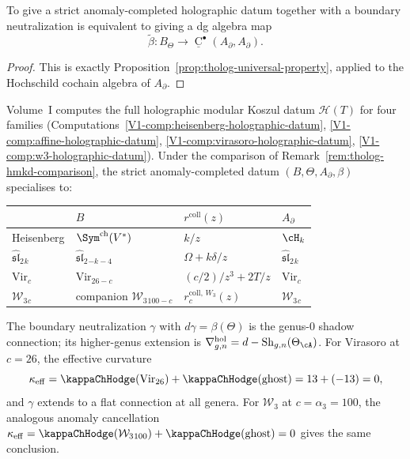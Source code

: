\begin{proposition}
To give a strict anomaly-completed holographic datum together with a boundary neutralization is equivalent to giving a dg algebra map
\[
\widetilde\beta:B_{\Theta}\longrightarrow \underline{\operatorname{C}}^{\bullet}(A_{\partial},A_{\partial}).
\]
\end{proposition}

\begin{proof}
This is exactly Proposition~\ref{prop:tholog-universal-property}, applied to the Hochschild cochain algebra of \(A_{\partial}\).
\end{proof}

\begin{remark}
Volume~I computes the full holographic modular Koszul datum
$\mathcal{H}(T)$ for four families
(Computations~\ref*{V1-comp:heisenberg-holographic-datum},
\ref*{V1-comp:affine-holographic-datum},
\ref*{V1-comp:virasoro-holographic-datum},
\ref*{V1-comp:w3-holographic-datum}).
Under the comparison of
Remark~\ref{rem:tholog-hmkd-comparison}, the strict
anomaly-completed datum $(B,\Theta,A_\partial,\beta)$
specialises to:
\begin{center}
\renewcommand{\arraystretch}{1.15}
\begin{tabular}{llll}
& $B$ & $r^{\mathrm{coll}}(z)$ & $A_\partial$ \\
\hline
Heisenberg & $\Sym^{\mathrm{ch}}(V^*)$ & $k/z$ & $\cH_k$ \\
$\widehat{\mathfrak{sl}}_2{}_k$
 & $\widehat{\mathfrak{sl}}_2{}_{-k-4}$
 & $\Omega + k\delta/z$
 & $\widehat{\mathfrak{sl}}_2{}_k$ \\
$\mathrm{Vir}_c$
 & $\mathrm{Vir}_{26-c}$
 & $(c/2)/z^3+2T/z$
 & $\mathrm{Vir}_c$ \\
$\mathcal W_3{}_c$
 & companion $\mathcal W_3{}_{100-c}$
 & $r_c^{\mathrm{coll},\,W_3}(z)$
 & $\mathcal W_3{}_c$
\end{tabular}
\end{center}
The boundary neutralization $\gamma$ with
$d\gamma=\beta(\Theta)$ is the genus-$0$ shadow connection;
its higher-genus extension is
$\nabla^{\mathrm{hol}}_{g,n}=d-\mathrm{Sh}_{g,n}(\Theta_\cA)$.
For Virasoro at $c=26$, the effective curvature
\[
\kappa_{\mathrm{eff}}
=\kappaChHodge(\mathrm{Vir}_{26})+\kappaChHodge(\mathrm{ghost})
=13+(-13)=0,
\]
and $\gamma$ extends to a flat connection at all genera.
For $\mathcal W_3$ at $c=\alpha_3=100$, the analogous anomaly
cancellation $\kappa_{\mathrm{eff}}=\kappaChHodge(\mathcal W_3{}_{100})
+\kappaChHodge(\mathrm{ghost})=0$ gives the same conclusion.
\end{remark}

